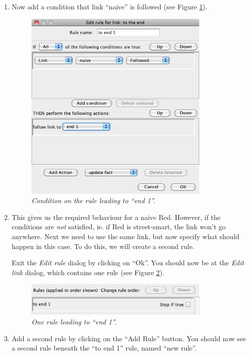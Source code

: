 \documentclass{article}
\begin{document}
\begin{enumerate}
\item Now add a condition that link ``naive'' is followed (see Figure
\ref{fig:tut2:to_end_1}).

\begin{figure}[h]
  \centering
  \includegraphics[width=9cm]{images/hypedyn-tutorial-2-figure-3}
  \caption{\textit{Condition on the rule leading to ``end 1''.}}
  \label{fig:tut2:to_end_1}
\end{figure}

\item This gives us the required behaviour for a naive Red. However, if the
conditions are \textit{not} satisfied, ie. if Red is street-smart, the link
won't go anywhere. Next we need to use the same link, but now specify what
should happen in this case. To do this, we will create a second rule.

Exit the \textit{Edit rule} dialog by clicking on ``Ok''. You should now be at
the \textit{Edit link} dialog, which contains one rule (see Figure
\ref{fig:tut2:rules_before}).

\begin{figure}[h]
  \centering
  \includegraphics[width=9cm]{images/hypedyn-tutorial-2-figure-4}
  \caption{\textit{One rule leading to ``end 1''.}}
  \label{fig:tut2:rules_before}
\end{figure}

\item Add a second rule by clicking on the ``Add Rule'' button. You should now
see a second rule beneath the ``to end 1'' rule, named ``new rule''.


\end{enumerate}
\end{document}
